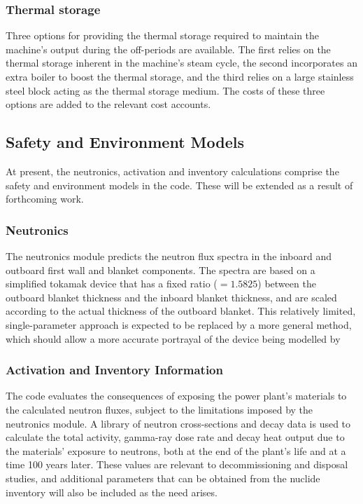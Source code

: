 \subsubsection{Thermal storage}
Three options for providing the thermal storage required to maintain the
machine's output during the off-periods are available. The first relies on the
thermal storage inherent in the machine's steam cycle, the second incorporates
an extra boiler to boost the thermal storage, and the third relies on a large
stainless steel block acting as the thermal storage medium. The costs of these
three options are added to the relevant cost accounts.

\subsection{Safety and Environment Models}
At present, the neutronics, activation and inventory calculations comprise the
safety and environment models in the code. These will be extended as a result
of forthcoming work.

\subsubsection{Neutronics}
The neutronics module predicts the neutron flux spectra in the inboard and
outboard first wall and blanket components. The spectra are based on a
simplified tokamak device that has a fixed ratio ($=1.5825$) between the
outboard blanket thickness and the inboard blanket thickness, and are scaled
according to the actual thickness of the outboard blanket. This relatively
limited, single-parameter approach is expected to be replaced by a more
general method, which should allow a more accurate portrayal of the device
being modelled by \PSD

\subsubsection{Activation and Inventory Information}
The code evaluates the consequences of exposing the power plant's materials to
the calculated neutron fluxes, subject to the limitations imposed by the
neutronics module. A library of neutron cross-sections and decay data is used
to calculate the total activity, gamma-ray dose rate and decay heat output due
to the materials' exposure to neutrons, both at the end of the plant's life
and at a time 100 years later. These values are relevant to decommissioning
and disposal studies, and additional parameters that can be obtained from the
nuclide inventory will also be included as the need arises.

